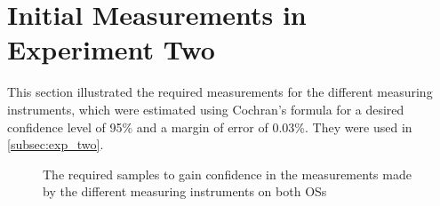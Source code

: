 \section{Initial Measurements in Experiment Two}\label{app:exp_two_coch}

This section illustrated the required measurements for the different measuring instruments, which were estimated using Cochran's formula for a desired confidence level of 95\% and a margin of error of 0.03\%. They were used in \cref{subsec:exp_two}.

% 
% 

\begin{figure}[H]
    \centering
    \begin{subfigure}[b]{0.4\textwidth}
        \centering
        
    \end{subfigure}
    \hfill
    \begin{subfigure}[b]{0.4\textwidth}
        \centering
        
    \end{subfigure}
    \caption{The required samples to gain confidence in the measurements made by the different measuring instruments on both OSs}
\end{figure}